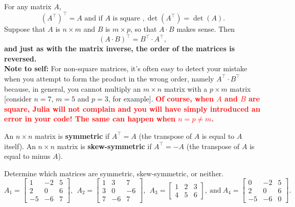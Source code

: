 \vspace*{.1cm}
\begin{tcolorbox}[title=\textbf{Properties of the Transpose Operation}]
For any matrix $A$, 
$$(A^\top)^\top = A \text{  and if }A \text{ is square }, \det(A^\top) = \det(A). $$
Suppose that $A$ is $n \times m$ and $B$ is $m \times p$, so that $A \cdot B$ makes sense. Then
$$ (A \cdot B)^\top = B^\top \cdot A^\top, $$
\textbf{and just as with the matrix inverse, the order of the matrices is reversed.} \\

\textbf{Note to self:} For non-square matrices, it's often easy to detect your mistake when you attempt to form the product in the wrong order, namely $A^\top \cdot B^\top$ because, in general, you cannot multiply an $m \times n$ matrix with a $p \times m$ matrix [consider $n=7$, $m=5$ and $p=3$, for example]. \textcolor{red}{\bf Of course, when $A$ and $B$ are square, Julia will not complain and you will have simply introduced an error in your code! The same can happen when $n=p \neq m$.} \end{tcolorbox}
\vspace*{0.2cm}


\begin{tcolorbox}[title=\textbf{Symmetric and Skew-symmetric Matrices}]
An $n \times n$ matrix is \textbf{symmetric} if $A^\top = A$ (the transpose of $A$ is equal to $A$ itself). An $n \times n$ matrix is \textbf{skew-symmetric} if $A^\top = -A$ (the transpose of $A$ is equal to minus $A$). 
\end{tcolorbox}
\vspace*{0.2cm}

\begin{example}
Determine which matrices are symmetric, skew-symmetric, or neither.
$$
A_1=\left[
\begin{array}{rrr}
1 & -2 & 5\\
2 & 0 & 6\\
-5 & -6 & 7
\end{array} \right],~~A_2=\left[
\begin{array}{rrr}
1 & 3 & 7\\
3 & 0 & -6\\
7 & -6 & 7
\end{array} \right],~~
A_3=\left[
\begin{array}{ccc}
1 & 2 & 3\\
4 & 5 & 6
\end{array} \right], ~\text{and}~A_4=\left[
\begin{array}{rrr}
0& -2 & 5\\
2 & 0 & 6\\
-5 & -6 & 0
\end{array} \right].
$$
\end{example}

